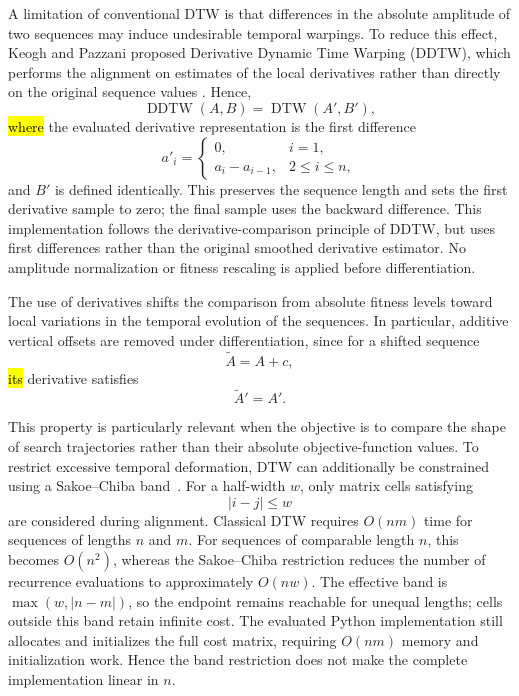\documentclass[mathematics,article,accept,moreauthors]{Definitions/mdpi}
\begin{document}
A limitation of conventional DTW is that differences in the absolute
amplitude of two sequences may induce undesirable temporal warpings. To
reduce this effect, Keogh and Pazzani proposed Derivative Dynamic Time
Warping (DDTW), which performs the alignment on estimates of the local
derivatives rather than directly on the original sequence values
\cite{keogh2001derivative}. Hence,
\begin{equation}
\operatorname{DDTW}(A,B)
=
\operatorname{DTW}(A',B'),
\end{equation}
\hl{where} the evaluated derivative representation is the first difference
\begin{equation}
a'_i=\begin{cases}
0, & i=1,\\
a_i-a_{i-1}, & 2\leq i\leq n,
\end{cases}
\label{eq:first_difference}
\end{equation}
and $B'$ is defined identically. This preserves the sequence length and
sets the first derivative sample to zero; the final sample uses the backward
difference. This implementation follows the derivative-comparison principle
of DDTW, but uses first differences rather than the original smoothed
derivative estimator. No amplitude normalization or fitness rescaling is
applied before differentiation.

The use of derivatives shifts the comparison from absolute fitness levels
toward local variations in the temporal evolution of the sequences. In
particular, additive vertical offsets are removed under differentiation,
since for a shifted sequence
\begin{equation}
\widetilde{A}=A+c,
\end{equation}
\hl{its} derivative satisfies
\begin{equation}
\widetilde{A}'=A'.
\end{equation}

This property is particularly relevant when the objective is to compare the
shape of search trajectories rather than their absolute objective-function
values. To restrict excessive temporal deformation, DTW can additionally be
constrained using a Sakoe--Chiba band~\cite{sakoe1978dynamic}. For a
half-width $w$, only matrix cells satisfying
\begin{equation}
|i-j|\leq w
\end{equation}
\noindent are considered during alignment. Classical DTW requires $O(nm)$ time for
sequences of lengths $n$ and $m$. For sequences of comparable length $n$,
this becomes $O(n^2)$, whereas the Sakoe--Chiba restriction reduces the
number of recurrence evaluations to approximately $O(nw)$. The effective
band is $\max(w,|n-m|)$, so the endpoint remains reachable for unequal
lengths; cells outside this band retain infinite cost. The evaluated Python
implementation still allocates and initializes the full cost matrix,
requiring $O(nm)$ memory and initialization work. Hence the band restriction
does not make the complete implementation linear in $n$.
\end{document}
